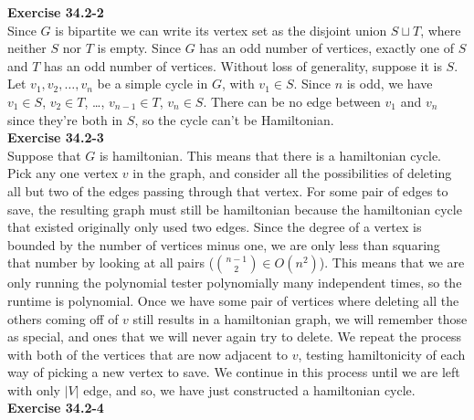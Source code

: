 \documentclass{article}
\begin{document}
\noindent\textbf{Exercise 34.2-2}\\

Since $G$ is bipartite we can write its vertex set as the disjoint union $S \sqcup T$, where neither $S$ nor $T$ is empty. Since $G$ has an odd number of vertices, exactly one of $S$ and $T$ has an odd number of vertices. Without loss of generality, suppose it is $S$.  Let $v_1, v_2, \ldots, v_n$ be a simple cycle in $G$, with $v_1 \in S$.  Since $n$ is odd, we have $v_1 \in S$, $v_2 \in T$, \ldots, $v_{n-1} \in T$, $v_n \in S$.  There can be no edge between $v_1$ and $v_n$ since they're both in $S$, so the cycle can't be Hamiltonian.  \\

\noindent\textbf{Exercise 34.2-3}\\

Suppose that $G$ is hamiltonian. This means that there is a hamiltonian cycle. Pick any one vertex $v$ in the graph, and consider all the possibilities of deleting all but two of the edges passing through that vertex. For some pair of edges to save, the resulting graph must still be hamiltonian because the hamiltonian cycle that existed originally only used two edges. Since the degree of a vertex is bounded by the number of vertices minus one, we are only less than squaring that number by looking at all pairs ($\binom{n-1}{2} \in O(n^2)$). This means that we are only running the polynomial tester polynomially many independent times, so the runtime is polynomial. Once we have some pair of vertices where deleting all the others coming off of $v$ still results in a hamiltonian graph, we will remember those as special, and ones that we will never again try to delete. We repeat the process with both of the vertices that are now adjacent to $v$, testing hamiltonicity of each way of picking a new vertex to save. We continue in this process until we are left with only $|V|$ edge, and so, we have just constructed a hamiltonian cycle.\\ 

\noindent\textbf{Exercise 34.2-4}\\
\end{document}
